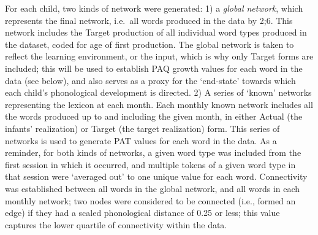 \documentclass[
  man,mask,floatsintext]{apa6}
\begin{document}
For each child, two kinds of network were generated: 1) a \emph{global network}, which represents the final network, i.e.~all words produced in the data by 2;6. This network includes the Target production of all individual word types produced in the dataset, coded for age of first production. The global network is taken to reflect the learning environment, or the input, which is why only Target forms are included; this will be used to establish PAQ growth values for each word in the data (see below), and also serves as a proxy for the `end-state' towards which each child's phonological development is directed. 2) A series of `known' networks representing the lexicon at each month. Each monthly known network includes all the words produced up to and including the given month, in either Actual (the infants' realization) or Target (the target realization) form. This series of networks is used to generate PAT values for each word in the data. As a reminder, for both kinds of networks, a given word type was included from the first session in which it occurred, and multiple tokens of a given word type in that session were `averaged out' to one unique value for each word. Connectivity was established between all words in the global network, and all words in each monthly network; two nodes were considered to be connected (i.e., formed an edge) if they had a scaled phonological distance of 0.25 or less; this value captures the lower quartile of connectivity within the data.
\end{document}
